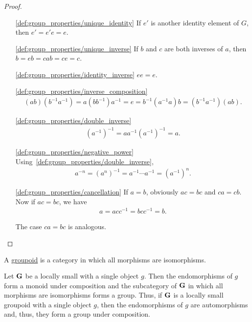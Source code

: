 \begin{proof}\mbox{}
  \begin{itemize}
    \item[\ref{def:group_properties/unique_identity}] If $e'$ is another identity element of $G$, then $e' = e' e = e$.
    \item[\ref{def:group_properties/unique_inverse}] If $b$ and $c$ are both inverses of $a$, then $b = eb = cab = ce = c$.
    \item[\ref{def:group_properties/identity_inverse}] $ee = e$.
    \item[\ref{def:group_properties/inverse_composition}]
    \begin{align*}
      (ab) (b^{-1} a^{-1})
      =
      a (b b^{-1}) a^{-1}
      =
      e
      =
      b^{-1} (a^{-1} a) b
      =
      (b^{-1} a^{-1}) (ab).
    \end{align*}

    \item[\ref{def:group_properties/double_inverse}]
    \begin{align*}
      (a^{-1})^{-1}
      =
      a a^{-1} (a^{-1})^{-1}
      =
      a.
    \end{align*}

    \item[\ref{def:group_properties/negative_power}] Using~\ref{def:group_properties/double_inverse},
    \begin{align*}
      a^{-n}
      =
      (a^n)^{-1}
      =
      a^{-1} \cdots a^{-1}
      =
      (a^{-1})^n.
    \end{align*}

    \item[\ref{def:group_properties/cancellation}] If $a = b$, obviously $ac = bc$ and $ca = cb$. Now if $ac = bc$, we have
    \begin{align*}
      a = acc^{-1} = bcc^{-1} = b.
    \end{align*}

    The case $ca = bc$ is analogous.
  \end{itemize}
\end{proof}

\begin{definition}\label{def:groupoid}
  A \uline{groupoid} is a category in which all morphisms are isomorphisms.
\end{definition}

\begin{definition}\label{note:groupoids}
  Let $\operatorname{\mathbf{G}}$ be a locally small with a single object $g$. Then the endomorphisms of $g$ form a monoid under composition and the subcategory of $\operatorname{\mathbf{G}}$ in which all morphisms are isomorphisms forms a group. Thus, if $\operatorname{\mathbf{G}}$ is a locally small groupoid with a single object $g$, then the endomorphisms of $g$ are automorphisms and, thus, they form a group under composition.
\end{definition}

